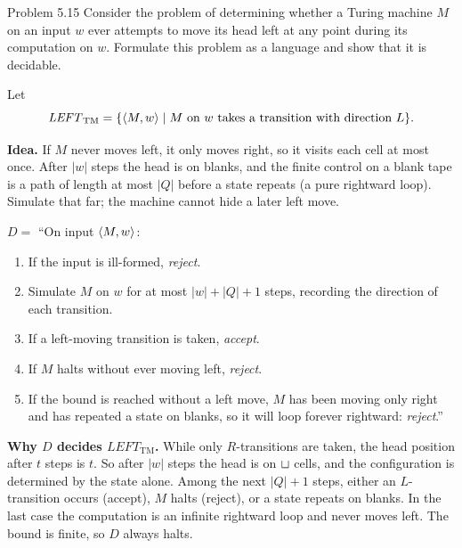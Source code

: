 \begin{question}{Problem 5.15}
Consider the problem of determining whether a Turing machine $M$ on an input $w$ ever attempts to move its head left at any point during its computation on $w$. Formulate this problem as a language and show that it is decidable.
\end{question}
\begin{soln}
Let
\[
\mathit{LEFT}_{\mathrm{TM}}
=\{\langle M,w\rangle\mid\text{$M$ on $w$ takes a transition with direction $L$}\}.
\]

\textbf{Idea.} If $M$ never moves left, it only moves right, so it visits each cell at most once. After $|w|$ steps the head is on blanks, and the finite control on a blank tape is a path of length at most $|Q|$ before a state repeats (a pure rightward loop). Simulate that far; the machine cannot hide a later left move.

$D=$ ``On input $\langle M,w\rangle$:
\begin{enumerate}
\item If the input is ill-formed, \emph{reject}.
\item Simulate $M$ on $w$ for at most $|w|+|Q|+1$ steps, recording the direction of each transition.
\item If a left-moving transition is taken, \emph{accept}.
\item If $M$ halts without ever moving left, \emph{reject}.
\item If the bound is reached without a left move, $M$ has been moving only right and has repeated a state on blanks, so it will loop forever rightward: \emph{reject}.''
\end{enumerate}

\textbf{Why $D$ decides $\mathit{LEFT}_{\mathrm{TM}}$.} While only $R$-transitions are taken, the head position after $t$ steps is $t$. So after $|w|$ steps the head is on $\sqcup$ cells, and the configuration is determined by the state alone. Among the next $|Q|+1$ steps, either an $L$-transition occurs (accept), $M$ halts (reject), or a state repeats on blanks. In the last case the computation is an infinite rightward loop and never moves left. The bound is finite, so $D$ always halts.
\end{soln}


